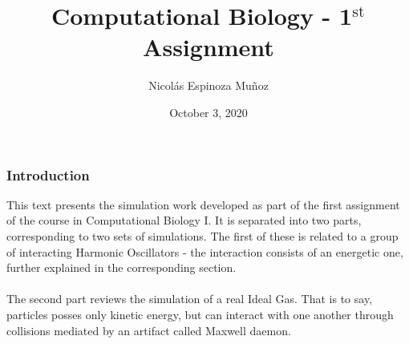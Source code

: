 \documentclass[a4paper, 12pt, notitlepage]{article}
\title{Computational Biology - 1$^\text{st}$ Assignment}
\author{Nicolás Espinoza Muñoz}
\date{October 3, 2020}
\begin{document}
\maketitle
\subsubsection*{Introduction}
This text presents the simulation work developed as part of the first assignment of the course in Computational Biology I. It is separated into two parts, corresponding to two sets of simulations. The first of these is related to a group of interacting Harmonic Oscillators - the interaction consists of an energetic one, further explained in the corresponding section.\\\\
The second part reviews the simulation of a real Ideal Gas. That is to say, particles posses only kinetic energy, but can interact with one another through collisions mediated by an artifact called Maxwell daemon.\\\\
\end{document}

